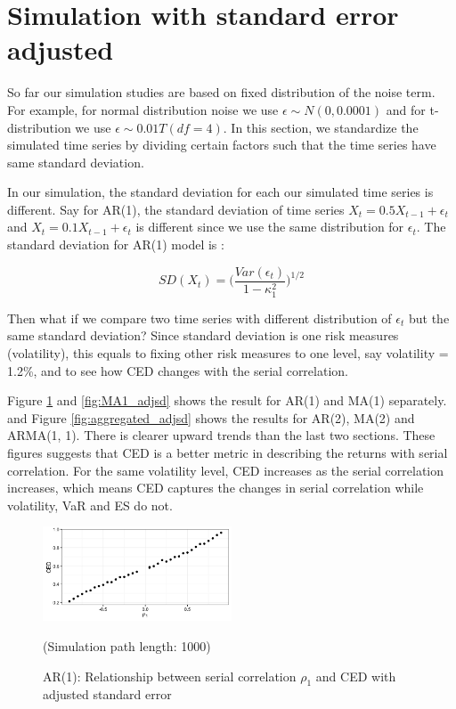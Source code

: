 \documentclass[11pt]{article}
\begin{document}
\section{Simulation with standard error adjusted} %

So far our simulation studies are based on fixed distribution of the noise term. For example, for normal distribution noise we use $\epsilon \sim N(0, 0.0001)$ and for t-distribution we use $\epsilon \sim 0.01T(df =4)$. In this section, we standardize the simulated time series by dividing certain factors such that the time series have same standard deviation. 

In our simulation, the standard deviation for each our simulated time series is different. Say for AR(1), the standard deviation of time series $X_t = 0.5  X_{t-1} + \epsilon_t$ and $X_t = 0.1  X_{t-1} + \epsilon_t$ is different since we use the same distribution for $\epsilon_t$. The standard deviation for AR(1) model is :

\begin{equation}
SD(X_t) = \Big(\frac{Var(\epsilon_t)}{1-\kappa_1^2}\Big)^{1/2}
\end{equation}

 Then what if we compare two time series with different distribution of $\epsilon_t$ but the same standard deviation? Since standard deviation is one risk measures (volatility), this equals to fixing other risk measures to one level, say volatility = 1.2\%, and to see how CED changes with the serial correlation. 

 Figure \ref{fig:AR1_adjsd} and \ref{fig:MA1_adjsd} shows the result for AR(1) and MA(1) separately. and Figure \ref{fig:aggregated_adjsd} shows the results for AR(2), MA(2) and ARMA(1, 1). There is clearer upward trends than the last two sections. These figures suggests that CED is a better metric in describing the returns with serial correlation. For the same volatility level, CED increases as the serial correlation increases, which means CED captures the changes in serial correlation while volatility, VaR and ES do not. 

\begin{figure}[H]
\centering
\includegraphics[width = 0.5\textwidth]{../figures/simulation/AR1_adjsd}
\caption{AR(1): Relationship between serial correlation $\rho_1$ and CED with adjusted standard error}
(Simulation path length: 1000)
\label{fig:AR1_adjsd}
\end{figure}
\end{document}
